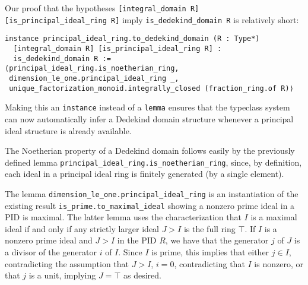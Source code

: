 \documentclass[a4paper,USenglish,cleveref, autoref, thm-restate]{lipics-v2021}
\newcommand{\lean}[1]{\texttt{#1}\xspace} %
\begin{document}
Our proof that the hypotheses \lean{[integral\_domain R] [is\_principal\_ideal\_ring R]} imply \lean{is\_dedekind\_domain R} is relatively short:
\begin{lstlisting}
instance principal_ideal_ring.to_dedekind_domain (R : Type*)
  [integral_domain R] [is_principal_ideal_ring R] :
  is_dedekind_domain R :=
⟨principal_ideal_ring.is_noetherian_ring,
 dimension_le_one.principal_ideal_ring _,
 unique_factorization_monoid.integrally_closed (fraction_ring.of R)⟩
\end{lstlisting}

Making this an \lean{instance} instead of a \lean{lemma} ensures that the typeclass system can now automatically infer a Dedekind domain structure whenever a principal ideal structure is already available.

The Noetherian property of a Dedekind domain follows easily by the previously defined lemma \lean{principal\_ideal\_ring.is\_noetherian\_ring}, since, by definition, each ideal in a principal ideal ring is finitely generated (by a single element).

The lemma \lean{dimension\_le\_one.principal\_ideal\_ring} is an instantiation of the existing result \lean{is\_prime.to\_maximal\_ideal} showing a nonzero prime ideal in a PID is maximal.
The latter lemma uses the characterization that $I$ is a maximal ideal if and only if any strictly larger ideal $J > I$ is the full ring $\top$.
If $I$ is a nonzero prime ideal and $J > I$ in the PID $R$, we have that the generator $j$ of $J$ is a divisor of the generator $i$ of $I$. Since $I$ is prime, this implies that either $j \in I$, contradicting the assumption that $J > I$, $i = 0$, contradicting that $I$ is nonzero, or that $j$ is a unit, implying $J = \top$ as desired.
\end{document}
